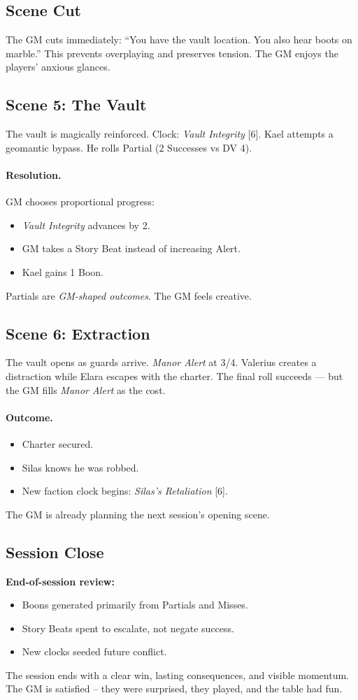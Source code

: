 \subsection*{Scene Cut}
The GM cuts immediately: “You have the vault location. You also hear boots on marble.”  
This prevents overplaying and preserves tension. The GM enjoys the players’ anxious glances.

\subsection*{Scene 5: The Vault}
The vault is magically reinforced. Clock: \emph{Vault Integrity} [6].  
Kael attempts a geomantic bypass. He rolls Partial (2 Successes vs DV 4).

\paragraph{Resolution.} GM chooses proportional progress:
\begin{itemize}
  \item \emph{Vault Integrity} advances by 2.
  \item GM takes a Story Beat instead of increasing Alert.
  \item Kael gains 1 Boon.
\end{itemize}
Partials are \emph{GM-shaped outcomes}. The GM feels creative.

\subsection*{Scene 6: Extraction}
The vault opens as guards arrive. \emph{Manor Alert} at 3/4.  
Valerius creates a distraction while Elara escapes with the charter. The final roll succeeds — but the GM fills \emph{Manor Alert} as the cost.

\paragraph{Outcome.}
\begin{itemize}
  \item Charter secured.
  \item Silas knows he was robbed.
  \item New faction clock begins: \emph{Silas’s Retaliation} [6].
\end{itemize}
The GM is already planning the next session’s opening scene.

\subsection*{Session Close}
\noindent\textbf{End-of-session review:}
\begin{itemize}
  \item Boons generated primarily from Partials and Misses.
  \item Story Beats spent to escalate, not negate success.
  \item New clocks seeded future conflict.
\end{itemize}
The session ends with a clear win, lasting consequences, and visible momentum. The GM is satisfied – they were surprised, they played, and the table had fun.

